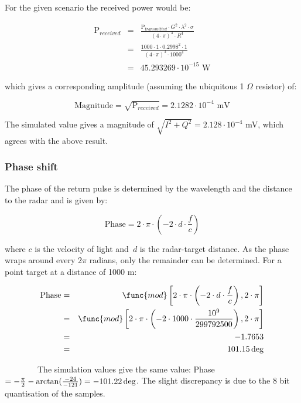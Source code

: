 For the given scenario the received power would be:

\begin{eqnarray}
\text{P}_{received} &=&\frac{\text{P}_{transmitted}\cdot G^{2}\cdot \lambda
^{2}\cdot \sigma }{(4\cdot \pi )^{3}\cdot R^{4}} \\
&=&\frac{1000\cdot 1\cdot 0.2998^{2}\cdot 1}{(4\cdot \pi )^{3}\cdot 1000^{4}}
\\
&=&45.293269\cdot 10^{-15}\text{ W}
\end{eqnarray}

which gives a corresponding amplitude (assuming the ubiquitous 1 $\Omega $
resistor) of:

\begin{equation}
\text{Magnitude}=\sqrt{\text{P}_{received}}=2.1282\cdot 10^{-4}\text{ mV}
\end{equation}

The simulated value gives a magnitude of $\sqrt{I^{2}+Q^{2}}=2.128\cdot
10^{-4}$ mV, which agrees with the above result.

\subsubsection{Phase shift}

The phase of the return pulse is determined by the wavelength and the
distance to the radar and is given by:

\begin{equation}
\text{Phase}=2\cdot \pi \cdot \left( -2\cdot d\cdot \frac{f}{c}\right) 
\end{equation}

where $c$ is the velocity of light and\ $d$ is the radar-target distance. As
the phase wraps around every 2$\pi $ radians, only the remainder can be
determined. For a point target at a distance of 1000 m:

\begin{eqnarray}
\text{Phase} &=&\func{mod}\left[ 2\cdot \pi \cdot \left( -2\cdot d\cdot 
\frac{f}{c}\right) ,2\cdot \pi \right]  \\
&=&\func{mod}\left[ 2\cdot \pi \cdot \left( -2\cdot 1000\cdot \frac{10^{9}}{%
299792500}\right) ,2\cdot \pi \right]  \\
&=&-1.7653 \\
&=&101.15\deg 
\end{eqnarray}

\ \ \ \ \ \ \ \ The simulation values give the same value: Phase $=-\frac{%
\pi }{2}-\arctan (\frac{-24}{-121})=-101.22\deg $. The slight discrepancy is
due to the 8 bit quantisation of the samples.

